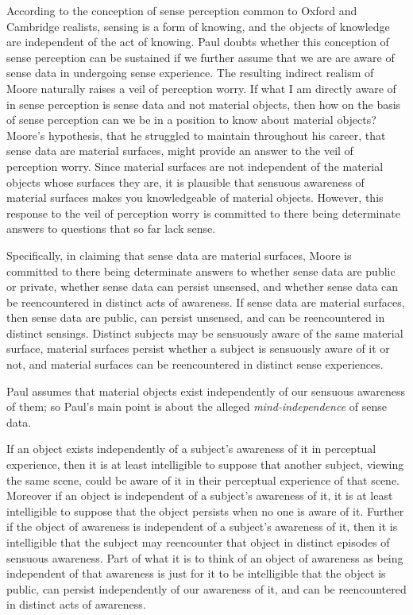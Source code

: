 According to the conception of sense perception common to Oxford and Cambridge realists, sensing is a form of knowing, and the objects of knowledge are independent of the act of knowing. Paul doubts whether this conception of sense perception can be sustained if we further assume that we are are aware of sense data in undergoing sense experience. The resulting indirect realism of Moore naturally raises a veil of perception worry. If what I am directly aware of in sense perception is sense data and not material objects, then how on the basis of sense perception can we be in a position to know about material objects? Moore's hypothesis, that he struggled to maintain throughout his career, that sense data are material surfaces, might provide an answer to the veil of perception worry. Since material surfaces are not independent of the material objects whose surfaces they are, it is plausible that sensuous awareness of material surfaces makes you knowledgeable of material objects. However, this response to the veil of perception worry is committed to there being determinate answers to questions that so far lack sense.

Specifically, in claiming that sense data are material surfaces, Moore is committed to there being determinate answers to whether sense data are public or private, whether sense data can persist unsensed, and whether sense data can be reencountered in distinct acts of awareness. If sense data are material surfaces, then sense data are public, can persist unsensed, and can be reencountered in distinct sensings. Distinct subjects may be sensuously aware of the same material surface, material surfaces persist whether a subject is sensuously aware of it or not, and material surfaces can be reencountered in distinct sense experiences.

Paul assumes that material objects exist independently of our sensuous awareness of them; so Paul's main point is about the alleged \emph{mind-independence} of sense data.

If an object exists independently of a subject's awareness of it in perceptual experience, then it is at least intelligible to suppose that another subject, viewing the same scene, could be aware of it in their perceptual experience of that scene. Moreover if an object is independent of a subject's awareness of it, it is at least intelligible to suppose that the object persists when no one is aware of it. Further if the object of awareness is independent of a subject's awareness of it, then it is intelligible that the subject may reencounter that object in distinct episodes of sensuous awareness. Part of what it is to think of an object of awareness as being independent of that awareness is just for it to be intelligible that the object is public, can persist independently of our awareness of it, and can be reencountered in distinct acts of awareness. 

